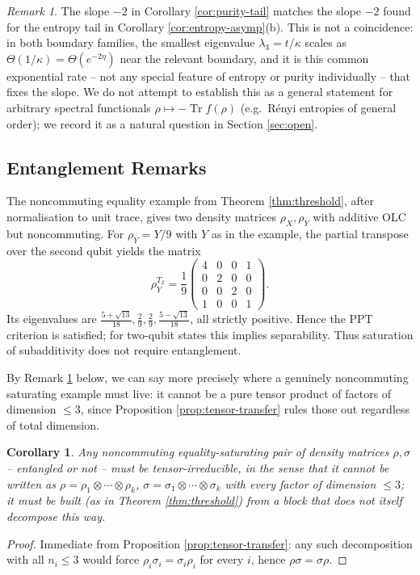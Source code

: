 \documentclass{article}
\newtheorem{corollary}[theorem]{Corollary}
\theoremstyle{remark}
\newtheorem{remark}[theorem]{Remark}
\begin{document}
\begin{remark}\label{rem:purity-slope}
The slope $-2$ in Corollary \ref{cor:purity-tail} matches the slope $-2$ found for the entropy tail in Corollary \ref{cor:entropy-asymp}(b). This is not a coincidence: in both boundary families, the smallest eigenvalue $\lambda_3=t/\kappa$ scales as $\Theta(1/\kappa)=\Theta(e^{-2\eta})$ near the relevant boundary, and it is this common exponential rate -- not any special feature of entropy or purity individually -- that fixes the slope. We do not attempt to establish this as a general statement for arbitrary spectral functionals $\rho\mapsto-\operatorname{Tr}f(\rho)$ (e.g.\ R\'enyi entropies of general order); we record it as a natural question in Section \ref{sec:open}.
\end{remark}

\subsection{Entanglement Remarks}\label{rem:entanglement-section}

The noncommuting equality example from Theorem \ref{thm:threshold}, after normalisation to unit trace, gives two density matrices $\rho_X,\rho_Y$ with additive OLC but noncommuting. For $\rho_Y=Y/9$ with $Y$ as in the example, the partial transpose over the second qubit yields the matrix
\[
\rho_Y^{T_2} = \frac19\begin{pmatrix}4&0&0&1\\0&2&0&0\\0&0&2&0\\1&0&0&1\end{pmatrix}.
\]
Its eigenvalues are $\tfrac{5+\sqrt{13}}{18},\tfrac29,\tfrac29,\tfrac{5-\sqrt{13}}{18}$, all strictly positive. Hence the PPT criterion is satisfied; for two-qubit states this implies separability. Thus saturation of subadditivity does not require entanglement.

By Remark \ref{rem:tensor-irred} below, we can say more precisely where a genuinely noncommuting saturating example must live: it cannot be a pure tensor product of factors of dimension $\le3$, since Proposition \ref{prop:tensor-transfer} rules those out regardless of total dimension.

\begin{corollary}\label{rem:tensor-irred}
Any noncommuting equality-saturating pair of density matrices $\rho,\sigma$ -- entangled or not -- must be tensor-irreducible, in the sense that it cannot be written as $\rho=\rho_1\otimes\cdots\otimes\rho_k$, $\sigma=\sigma_1\otimes\cdots\otimes\sigma_k$ with every factor of dimension $\le3$; it must be built (as in Theorem \ref{thm:threshold}) from a block that does not itself decompose this way.
\end{corollary}
\begin{proof}
Immediate from Proposition \ref{prop:tensor-transfer}: any such decomposition with all $n_i\le3$ would force $\rho_i\sigma_i=\sigma_i\rho_i$ for every $i$, hence $\rho\sigma=\sigma\rho$.
\end{proof}
\end{document}
